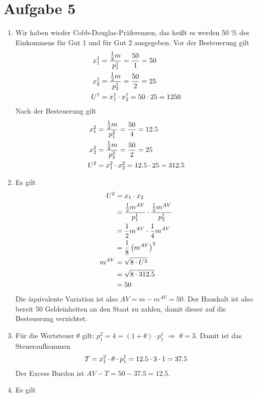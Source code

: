 \documentclass{article}
\begin{document}
	\section*{Aufgabe 5}
	\begin{enumerate}[label=(\alph*)]
		\item Wir haben wieder Cobb-Douglas-Präferenzen, das heißt es werden 50 \% des Einkommens für Gut 1 und für Gut 2 ausgegeben. Vor der Besteuerung gilt
		\begin{align}
			x_1^1 &= \frac{\frac{1}{2}m}{p_1^1} = \frac{50}{1} = 50 \notag \\
			x_2^1 &= \frac{\frac{1}{2}m}{p_2^1} = \frac{50}{2} = 25 \notag \\
			U^1 &= x_1^1 \cdot x_2^1 = 50\cdot 25 = 1250 \notag
		\end{align}
		Nach der Besteuerung gilt
		\begin{align}
			x_1^2 &= \frac{\frac{1}{2}m}{p_1^2} = \frac{50}{4} = 12.5 \notag \\
			x_2^2 &= \frac{\frac{1}{2}m}{p_2^2} = \frac{50}{2} = 25 \notag \\
			U^2 &= x_1^2 \cdot x_2^2 = 12.5\cdot 25 = 312.5 \notag
		\end{align}
		\item Es gilt
		\begin{align}
			U^2 &= x_1 \cdot x_2 \notag \\
			&= \frac{\frac{1}{2}m^{AV}}{p_1^1} \cdot \frac{\frac{1}{2}m^{AV}}{p_2^1} \notag \\
			&= \frac{1}{2}m^{AV} \cdot \frac{1}{4}m^{AV} \notag \\
			&= \frac{1}{8}\left(m^{AV}\right)^2 \notag \\
			m^{AV} &= \sqrt{8\cdot U^2} \notag \\
			&= \sqrt{8\cdot 312.5} \notag \\
			&= 50 \notag
		\end{align}
		Die äquivalente Variation ist also $AV=m-m^{AV}=50$. Der Haushalt ist also bereit 50 Geldeinheiten an den Staat zu zahlen, damit dieser auf die Besteuerung verzichtet.
		\item Für die Wertsteuer $\theta$ gilt: $p_1^2 = 4 = (1+\theta)\cdot p_1^1$ $\Rightarrow$ $\theta=3$. Damit ist das Steueraufkommen
		\begin{align}
			T = x_1^2 \cdot\theta \cdot p_1^1 = 12.5\cdot 3\cdot 1 = 37.5 \notag
		\end{align}
		Der Excess Burden ist $AV - T = 50-37.5=12.5$.
		\item Es gilt

\end{enumerate}
\end{document}
